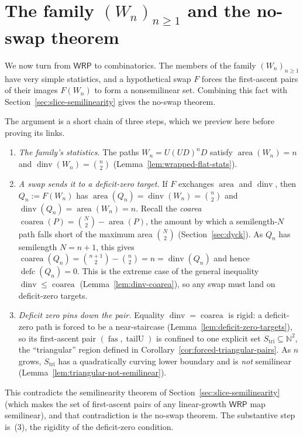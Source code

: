 \documentclass[11pt]{article}
\theoremstyle{definition}
\newcommand{\N}{\mathbb N}
\newcommand{\WRP}{\mathsf{WRP}}
\newcommand{\area}{\operatorname{area}}
\newcommand{\dinv}{\operatorname{dinv}}
\newcommand{\coarea}{\operatorname{coarea}}
\newcommand{\defc}{\operatorname{defc}}
\newcommand{\fas}{\operatorname{fas}}
\newcommand{\tailU}{\operatorname{tailU}}
\begin{document}
\section{The family \texorpdfstring{$(W_n)_{n\ge1}$}{(Wn), n >= 1}
and the no-swap theorem}\label{sec:wrapped-flat}\label{sec:main}

We now turn from $\WRP$ to combinatorics.  The members of the family
$(W_n)_{n\ge1}$ have very simple statistics, and a hypothetical swap $F$
forces the first-ascent pairs of their images $F(W_n)$ to form a nonsemilinear
set.  Combining this fact with
Section~\ref{sec:slice-semilinearity} gives the no-swap theorem.

The argument is a short chain of three steps, which we preview here before
proving its links.
\begin{enumerate}[label=(\arabic*)]
\item \emph{The family's statistics.}  The paths $W_n=U(UD)^nD$ satisfy
$\area(W_n)=n$ and $\dinv(W_n)=\binom n2$ (Lemma~\ref{lem:wrapped-flat-stats}).
\item \emph{A swap sends it to a deficit-zero target.}  If $F$ exchanges
$\area$ and $\dinv$, then $Q_n:=F(W_n)$ has
$\area(Q_n)=\dinv(W_n)=\binom n2$ and
$\dinv(Q_n)=\area(W_n)=n$.  Recall the \emph{coarea}
$\coarea(P)=\binom N2-\area(P)$, the amount by which a semilength-$N$ path falls
short of the maximum area $\binom N2$ (Section~\ref{sec:dyck}).  As $Q_n$ has
semilength $N=n+1$, this gives $\coarea(Q_n)=\binom{n+1}2-\binom n2=n=\dinv(Q_n)$
and hence $\defc(Q_n)=0$.  This is the extreme case of the general inequality
$\dinv\le\coarea$ (Lemma~\ref{lem:dinv-coarea}), so any swap must land on
deficit-zero targets.
\item \emph{Deficit zero pins down the pair.}  Equality $\dinv=\coarea$ is
rigid: a deficit-zero path is forced to be a near-staircase
(Lemma~\ref{lem:deficit-zero-targets}), so its first-ascent pair $(\fas,\tailU)$ is
confined to one explicit set $S_{\mathrm{tri}}\subseteq\N^2$, the ``triangular''
region defined in Corollary~\ref{cor:forced-triangular-pairs}.  As $n$ grows,
$S_{\mathrm{tri}}$ has a quadratically curving lower boundary and is \emph{not}
semilinear (Lemma~\ref{lem:triangular-not-semilinear}).
\end{enumerate}
This contradicts the semilinearity theorem of
Section~\ref{sec:slice-semilinearity} (which makes the set of first-ascent pairs
of any linear-growth $\WRP$ map semilinear), and that contradiction is the
no-swap theorem.  The substantive step is~(3), the rigidity of the
deficit-zero condition.
\end{document}
